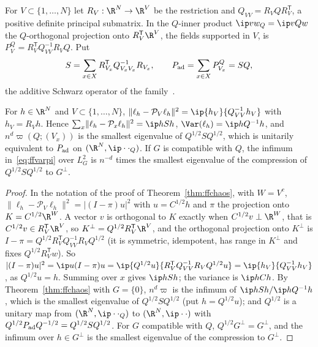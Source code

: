 For $V\subset\{1,\dots,N\}$ let $R_V:\R^N\to\R^V$ be the restriction and
$Q_{VV}=R_VQR_V^{\mathsf T}$, a positive definite principal submatrix. In
the $Q$-inner product $\ip vw_Q=\ip v{Qw}$ the $Q$-orthogonal projection onto
$R_V^{\mathsf T}\R^V$, the fields supported in $V$, is $P_V^Q=R_V^{\mathsf T}
Q_{VV}^{-1}R_VQ$. Put
\begin{equation}\label{eq:ffschwarz}
S=\sum_{x\in X}R_{V_x}^{\mathsf T}Q_{V_xV_x}^{-1}R_{V_x},\qquad
P_{\rm ad}=\sum_{x\in X}P^Q_{V_x}=SQ,
\end{equation}
the additive Schwarz operator of the family~\cite{Lio88,TW05}.

\begin{lemma}\label{lem:fflinear}
For $h\in\R^N$ and $V\subset\{1,\dots,N\}$,
$\lVert\ell_h-\mathcal P_V\ell_h\rVert^2=\ip{h_V}{Q_{VV}^{-1}h_V}$ with
$h_V=R_Vh$. Hence $\sum_x\lVert\ell_h-\mathcal P_x\ell_h\rVert^2=\ip h{Sh}$,
$\Var(\ell_h)=\ip h{Q^{-1}h}$, and $n^d\varpi(Q;(V_x))$ is the smallest
eigenvalue of $Q^{1/2}SQ^{1/2}$, which is unitarily equivalent to $P_{\rm
ad}$ on $(\R^N,\ip\cdot\cdot_Q)$. If $G$ is compatible with $Q$, the infimum
in~\eqref{eq:ffvarpi} over $L^2_G$ is $n^{-d}$ times the smallest eigenvalue
of the compression of $Q^{1/2}SQ^{1/2}$ to $G^\perp$.
\end{lemma}

\begin{proof}
In the notation of the proof of Theorem~\ref{thm:ffchaos}, with $W=V^c$,
$\lVert\ell_h-\mathcal P_V\ell_h\rVert^2=\lvert(I-\pi)u\rvert^2$ with $u=
C^{1/2}h$ and $\pi$ the projection onto $K=C^{1/2}\R^W$. A vector $v$ is
orthogonal to $K$ exactly when $C^{1/2}v\perp\R^W$, that is $C^{1/2}v\in R_V^{
\mathsf T}\R^V$, so $K^\perp=Q^{1/2}R_V^{\mathsf T}\R^V$, and the orthogonal
projection onto $K^\perp$ is $I-\pi=Q^{1/2}R_V^{\mathsf T}Q_{VV}^{-1}R_V
Q^{1/2}$ (it is symmetric, idempotent, has range in $K^\perp$ and fixes
$Q^{1/2}R_V^{\mathsf T}w$). So $\lvert(I-\pi)u\rvert^2=\ip u{(I-\pi)u}=
\ip{Q^{1/2}u}{R_V^{\mathsf T}Q_{VV}^{-1}R_VQ^{1/2}u}=\ip{h_V}{Q_{VV}^{-1}
h_V}$, as $Q^{1/2}u=h$. Summing over $x$ gives $\ip h{Sh}$; the variance is
$\ip h{Ch}$. By Theorem~\ref{thm:ffchaos} with $G=\{0\}$, $n^d\varpi$ is the
infimum of $\ip h{Sh}/\ip h{Q^{-1}h}$, which is the smallest eigenvalue of
$Q^{1/2}SQ^{1/2}$ (put $h=Q^{1/2}u$); and $Q^{1/2}$ is a unitary map from
$(\R^N,\ip\cdot\cdot_Q)$ to $(\R^N,\ip\cdot\cdot)$ with $Q^{1/2}P_{\rm ad}
Q^{-1/2}=Q^{1/2}SQ^{1/2}$. For $G$ compatible with $Q$, $Q^{1/2}G^\perp=
G^\perp$, and the infimum over $h\in G^\perp$ is the smallest eigenvalue of
the compression to $G^\perp$.
\end{proof}

